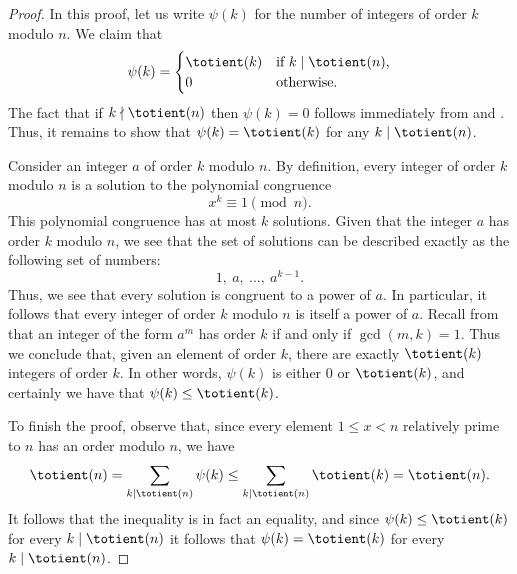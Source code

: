 \begin{proof}
  In this proof, let us write $\psi(k)$ for the number of integers of order $k$ modulo $n$. We claim that
  \begin{equation*}
    \psi(k)=
    \begin{cases}
      \totient(k) & \text{if $k\mid \totient(n)$,} \\
      0 & \text{otherwise.}
    \end{cases}
  \end{equation*}
  The fact that if $k\nmid \totient(n)$ then $\psi(k)=0$ follows immediately from  and . Thus, it remains to show that $\psi(k)=\totient(k)$ for any $k\mid \totient(n)$.

  Consider an integer $a$ of order $k$ modulo $n$. By definition, every integer of order $k$ modulo $n$ is a solution to the polynomial congruence
  \begin{equation*}
    x^k\equiv 1 \pmod{n}.
  \end{equation*}
  This polynomial congruence has at most $k$ solutions. Given that the integer $a$ has order $k$ modulo $n$, we see that the set of solutions can be described exactly as the following set of numbers:
  \begin{equation*}
    1,~a,~\ldots,~a^{k-1}.
  \end{equation*}
  Thus, we see that every solution is congruent to a power of $a$. In particular, it follows that every integer of order $k$ modulo $n$ is itself a power of $a$. Recall from  that an integer of the form $a^m$ has order $k$ if and only if $\gcd(m,k)=1$. Thus we conclude that, given an element of order $k$, there are exactly $\totient(k)$ integers of order $k$. In other words, $\psi(k)$ is either $0$ or $\totient(k)$, and certainly we have that $\psi(k)\leq \totient(k)$.

  To finish the proof, observe that, since every element $1\leq x<n$ relatively prime to $n$ has an order modulo $n$, we have
  \begin{equation*}
    \totient(n) =\sum_{k\mid \totient(n)}\psi(k)\leq \sum_{k\mid \totient(n)}\totient(k)=\totient(n).
  \end{equation*}
  It follows that the inequality is in fact an equality, and since $\psi(k)\leq \totient(k)$ for every $k\mid\totient(n)$ it follows that $\psi(k)=\totient(k)$ for every $k\mid \totient(n)$.
\end{proof}

